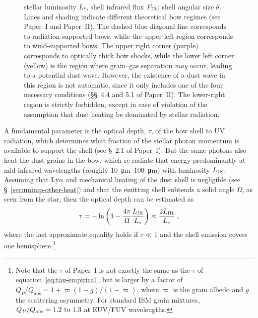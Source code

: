 \begin{figure}
{    stellar luminosity \(L_*\), shell infrared flux \(F_{\text{IR}}\); shell
    angular size \(\theta\).  Lines and shading indicate different
    theoretical bow regimes (see Paper~I and Paper~II).  The dashed
    blue diagonal line corresponds to radiation-supported bows, while
    the upper left region corresponds to wind-supported bows.  The
    upper right corner (purple) corresponds to optically thick bow
    shocks, while the lower left corner (yellow) is the region where
    grain--gas separation \textit{may} occur, leading to a potential
    dust wave.  However, the existence of a dust wave in this region
    is not automatic, since it only includes one of the four necessary
    conditions (\S\S~4.4 and 5.1 of Paper~II). The lower-right region
    is strictly forbidden, except in case of violation of the
    assumption that dust heating be dominated by stellar radiation. }
  \label{fig:All-sources-eta-tau}
\end{figure}


A fundamental parameter is the optical depth, \(\tau\), of the bow
shell to UV radiation, which determines what fraction of the stellar
photon momentum is available to support the shell (see
\S~2.1 of Paper~I).  But the same photons also heat the
dust grains in the bow, which re-radiate that energy predominantly at
mid-infrared wavelengths (roughly \SIrange{10}{100}{\um}) with
luminosity \(L_{\text{IR}}\).  Assuming that Ly\(\alpha\) and mechanical
heating of the dust shell is negligible (see
\S~\ref{sec:unimp-other-heat}) and that the emitting shell subtends a
solid angle \(\Omega\), as seen from the star, then the optical depth
can be estimated as
\begin{equation}
  \label{eq:tau-empirical}
  \tau = -\ln \left( 1 - \frac{4\pi}{\Omega} \frac{L_{\text{IR}}}{L_*} \right)
  \approx \frac{2 L_{\text{IR}}}{L_*} \ ,
\end{equation}
where the last approximate equality holds if \(\tau \ll 1\) and the shell
emission covers one hemisphere.\footnote{%
  Note that the \(\tau\) of Paper~I is not exactly the same as the
  \(\tau\) of equation~\eqref{eq:tau-empirical}, but is larger by a
  factor of
  \(Q_P / Q_{\text{abs}} = 1 + \varpi (1 - g)/(1 - \varpi)\), where
  \(\varpi\) is the grain albedo and \(g\) the scattering asymmetry.
  For standard ISM grain mixtures,
  \(Q_P / Q_{\text{abs}} = \text{\numrange{1.2}{1.3}}\) at EUV/FUV
  wavelengths.}

